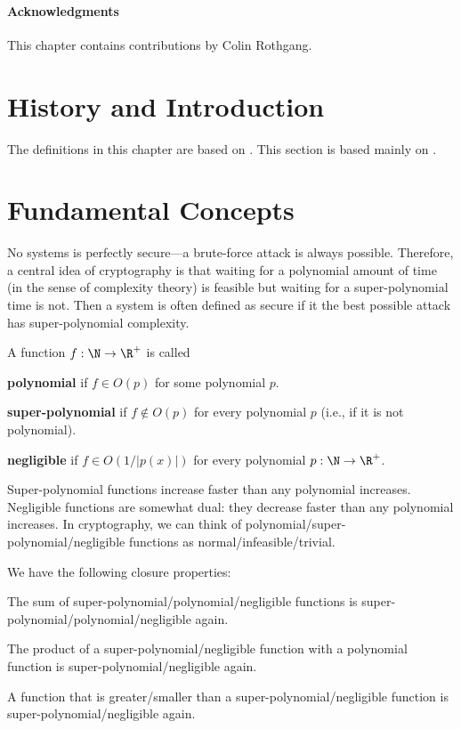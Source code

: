 \paragraph{Acknowledgments}This chapter contains contributions by Colin Rothgang.

\section{History and Introduction}\label{sec:sd:crypto:hist}
The definitions in this chapter are based on \cite{PuMaC2016}. 
This section is based mainly on \cite{cryptoNetworkSlides}. 


\section{Fundamental Concepts}

No systems is perfectly secure---a brute-force attack is always possible.
Therefore, a central idea of cryptography is that waiting for a polynomial amount of time (in the sense of complexity theory) is feasible but waiting for a super-polynomial time is not.
Then a system is often defined as secure if it the best possible attack has super-polynomial complexity.


\begin{definition}
 A function $f:\N\to\R^+$ is called
  \begin{compactitem}
   \item \textbf{polynomial} if $f\in O(p)$ for some polynomial $p$.
   \item \textbf{super-polynomial} if $f\nin O(p)$ for every polynomial $p$ (i.e., if it is not polynomial).
   \item \textbf{negligible} if $f\in O(1/|p(x)|)$ for every polynomial $p:\N\to\R^+$.
  \end{compactitem}
\end{definition}


Super-polynomial functions increase faster than any polynomial increases.
Negligible functions are somewhat dual: they decrease faster than any polynomial increases.
In cryptography, we can think of polynomial/super-polynomial/negligible functions as normal/infeasible/trivial.


\begin{theorem}
We have the following closure properties:
\begin{compactitem}
 \item The sum of super-polynomial/polynomial/negligible functions is super-polynomial/polynomial/negligible again.
 \item The product of a super-polynomial/negligible function with a polynomial function is super-polynomial/negligible again.
 \item A function that is greater/smaller than a super-polynomial/negligible function is super-polynomial/negligible again.
\end{compactitem}
\end{theorem}

